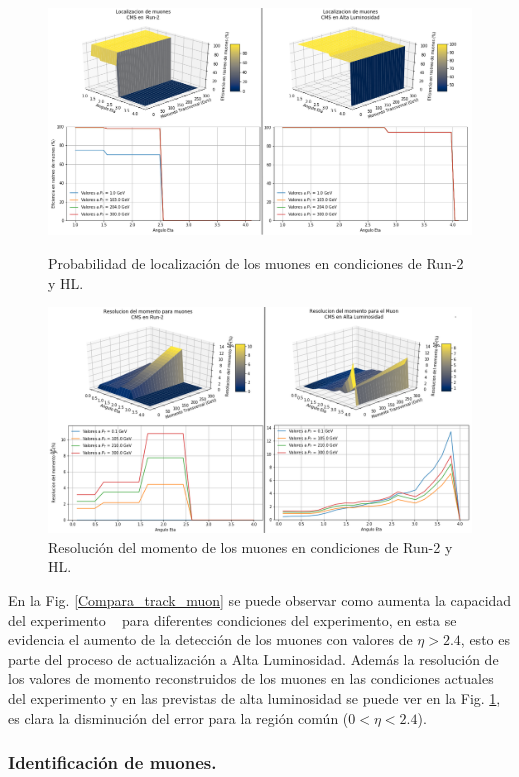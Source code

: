 \begin{figure}[!h]
\centering
\includegraphics[width=.95\textwidth]{Analisis_y_Resultados/imagenes/Tracking_of_Muon.png}
\caption{Probabilidad de localización de los muones en condiciones de Run-2 y HL.}
\label{Compara_track_muon}
\includegraphics[width=.95\textwidth]{Analisis_y_Resultados/imagenes/Momentum_resolution_of_Muon.png}
\caption{Resolución del momento de los muones en condiciones de Run-2 y HL.}
\label{Compara_sol_muon}
\end{figure}
En la Fig. \ref{Compara_track_muon} se puede observar como aumenta la capacidad del experimento \CMS ~ para diferentes condiciones del experimento, en esta se evidencia el aumento de la detección de los muones con valores de $\eta > 2.4$, esto es parte del proceso de actualización a Alta Luminosidad. Además la resolución de los valores de momento reconstruidos de los muones en las condiciones actuales del experimento y en las previstas de alta luminosidad se puede ver en la Fig. \ref{Compara_sol_muon}, es clara la disminución del error para la región común ($0<\eta < 2.4$).

\subsubsection{Identificación de muones.}

